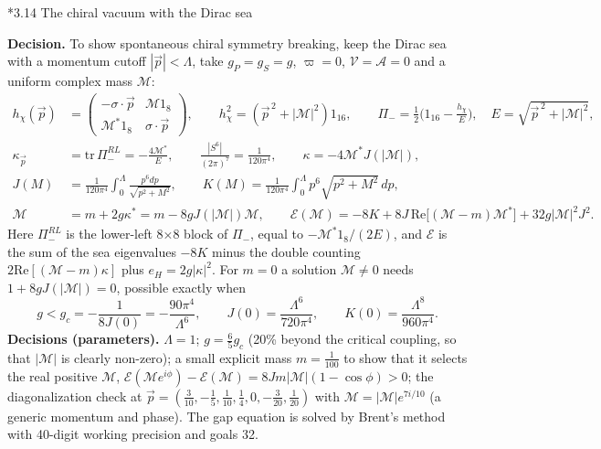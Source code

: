 \documentclass[10pt,a4paper]{article}
\makeatletter
\renewcommand\subsection{\@startsection{subsection}{2}{\z@}{-3.25ex\@plus -1ex \@minus -.2ex}{1.5ex \@plus .2ex}{\normalfont\large\bfseries\raggedright}}
\makeatother
\begin{document}
\subsection*{3.14 The chiral vacuum with the Dirac sea}
\textbf{Decision.} To show spontaneous chiral symmetry breaking, keep the Dirac sea with a momentum cutoff $|\vec p|<\Lambda$, take $g_P=g_S=g$, $\varpi=0$, $\mathcal V=\mathcal A=0$ and a uniform complex mass $\mathcal M$:
\begin{align*}
h_\chi(\vec p)&=\begin{pmatrix}-\sigma\cdot\vec p&\mathcal M1_8\\ \mathcal M^*1_8&\sigma\cdot\vec p\end{pmatrix},\qquad h_\chi^2=(\vec p^{\,2}+|\mathcal M|^2)1_{16},\qquad \Pi_-=\frac12\Big(1_{16}-\frac{h_\chi}{E}\Big),\quad E=\sqrt{\vec p^{\,2}+|\mathcal M|^2}, \\
\kappa_{\vec p}&=\mathrm{tr}\,\Pi_-^{RL}=-\frac{4\mathcal M^*}{E},\qquad \frac{|S^6|}{(2\pi)^7}=\frac1{120\pi^4},\qquad \kappa=-4\mathcal M^*J(|\mathcal M|), \\
J(M)&=\frac1{120\pi^4}\int_0^\Lambda\frac{p^6dp}{\sqrt{p^2+M^2}},\qquad K(M)=\frac1{120\pi^4}\int_0^\Lambda p^6\sqrt{p^2+M^2}\,dp, \\
\mathcal M&=m+2g\kappa^*=m-8gJ(|\mathcal M|)\mathcal M,\qquad \mathcal E(\mathcal M)=-8K+8J\,\mathrm{Re}\big[(\mathcal M-m)\mathcal M^*\big]+32g|\mathcal M|^2J^2 .
\end{align*}
Here $\Pi_-^{RL}$ is the lower-left 8×8 block of $\Pi_-$, equal to $-\mathcal M^*1_8/(2E)$, and $\mathcal E$ is the sum of the sea eigenvalues $-8K$ minus the double counting $2\mathrm{Re}[(\mathcal M-m)\kappa]$ plus $e_H=2g|\kappa|^2$. For $m=0$ a solution $\mathcal M\neq0$ needs $1+8gJ(|\mathcal M|)=0$, possible exactly when
\begin{equation*}
g<g_c=-\frac1{8J(0)}=-\frac{90\pi^4}{\Lambda^6},\qquad J(0)=\frac{\Lambda^6}{720\pi^4},\qquad K(0)=\frac{\Lambda^8}{960\pi^4}.
\end{equation*}
\textbf{Decisions (parameters).} $\Lambda=1$; $g=\frac65g_c$ (20\% beyond the critical coupling, so that $|\mathcal M|$ is clearly non-zero); a small explicit mass $m=\frac1{100}$ to show that it selects the real positive $\mathcal M$, $\mathcal E(\mathcal Me^{i\phi})-\mathcal E(\mathcal M)=8Jm|\mathcal M|(1-\cos\phi)>0$; the diagonalization check at $\vec p=(\frac3{10},-\frac15,\frac1{10},\frac14,0,-\frac3{20},\frac1{20})$ with $\mathcal M=|\mathcal M|e^{7i/10}$ (a generic momentum and phase). The gap equation is solved by Brent’s method with 40-digit working precision and goals 32.
\end{document}
